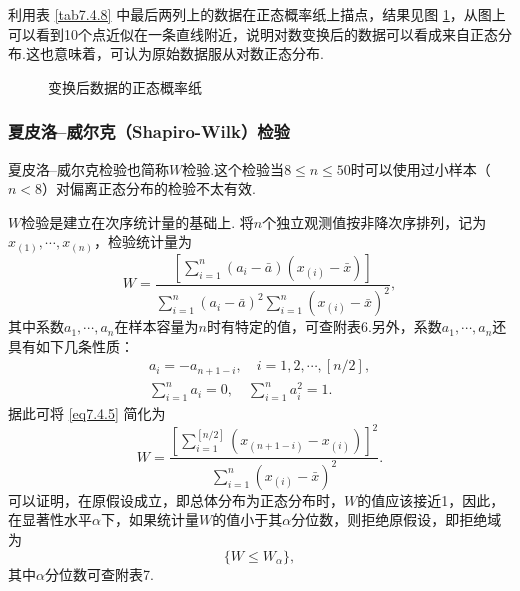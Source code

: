 \begin{example}
  利用表 \ref{tab7.4.8} 中最后两列上的数据在正态概率纸上描点，结果见图 \ref{fig7.4.4}，从图上可以看到10个点近似在一条直线附近，说明对数变换后的数据可以看成来自正态分布.这也意味着，可认为原始数据服从对数正态分布.
  \begin{figure}[!ht]
    \centering
   \caption{变换后数据的正态概率纸}\label{fig7.4.4}
  \end{figure}
\end{example}

\subsubsection{夏皮洛--威尔克（Shapiro-Wilk）检验}
夏皮洛--威尔克检验也简称$W$检验.这个检验当$8\le n\le50$时可以使用过小样本（$n<8$）对偏离正态分布的检验不太有效.

$W$检验是建立在次序统计量的基础上. 将$n$个独立观测值按非降次序排列，记为$x_{(1)},\cdots,x_{(n)}$，检验统计量为
\begin{equation}\label{eq7.4.5}
  W = \frac{\left[ \sum_{i=1}^n(a_i-\bar a)(x_{(i)}-\bar x) \right]}{\sum_{i=1}^n(a_i-\bar a)^2\sum_{i=1}^n(x_{(i)}-\bar x)^2},
\end{equation}
其中系数$a_1,\cdots,a_n$在样本容量为$n$时有特定的值，可查附表6.另外，系数$a_1,\cdots,a_n$还具有如下几条性质：
\begin{gather*}
  a_i = -a_{n+1-i},\quad i = 1,2,\cdots,[n/2], \\
  \sum_{i=1}^na_i = 0,\quad \sum_{i=1}^na_i^2 = 1.
\end{gather*}
据此可将 \eqref{eq7.4.5} 简化为
\begin{equation}\label{eq7.4.6}
  W = \frac{\left[ \sum_{i=1}^{[n/2]}(x_{(n+1-i)}-x_{(i)}) \right]^2}{\sum_{i=1}^n(x_{(i)} - \bar x)^2}.
\end{equation}
可以证明，在原假设成立，即总体分布为正态分布时，$W$的值应该接近1，因此，在显著性水平$\alpha$下，如果统计量$W$的值小于其$\alpha$分位数，则拒绝原假设，即拒绝域为
\[
  \{ W \le W_\alpha \},
\]
其中$\alpha$分位数可查附表7.

